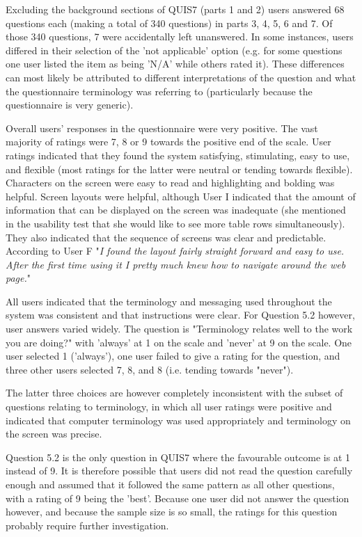 Excluding the background sections of QUIS7 (parts 1 and 2) users answered 68 questions each (making a total of 340 questions) in parts 3, 4, 5, 6 and 7. Of those 340 questions, 7 were accidentally left unanswered. In some instances, users differed in their selection of the 'not applicable' option (e.g. for some questions one user listed the item as being 'N/A' while others rated it). These differences can most likely be attributed to different interpretations of the question and what the questionnaire terminology was referring to (particularly because the questionnaire is very generic).

Overall users' responses in the questionnaire were very positive. The vast majority of ratings were 7, 8 or 9 towards the positive end of the scale.  User ratings indicated that they found the system satisfying, stimulating, easy to use, and flexible (most ratings for the latter were neutral or tending towards flexible). Characters on the screen were easy to read and highlighting and bolding was helpful. Screen layouts were helpful, although User I indicated that the amount of information that can be displayed on the screen was inadequate (she mentioned in the usability test that she would like to see more table rows simultaneously). They also indicated that the sequence of screens was clear and predictable. According to User F "\textit{I found the layout fairly straight forward and easy to use. After the first time using it I pretty much knew how to navigate around the web page.}"

All users indicated that the terminology and messaging used throughout the system was consistent and that instructions were clear. For Question 5.2 however, user answers varied widely. The question is "Terminology relates well to the work you are doing?"  with 'always' at 1 on the scale and 'never' at 9 on the scale. One user selected 1 ('always'), one user failed to give a rating for the question, and three other users selected 7, 8, and 8 (i.e. tending towards "never"). 

The latter three choices are however completely inconsistent with the subset of questions relating to terminology, in which all user ratings were positive and indicated that computer terminology was used appropriately and terminology on the screen was precise. 

Question 5.2 is the only question in QUIS7 where the favourable outcome is at 1 instead of 9. It is therefore possible that users did not read the question carefully enough and assumed that it followed the same pattern as all other questions, with a rating of 9 being the 'best'. Because one user did not answer the question however, and because the sample size is so small, the ratings for this question probably require further investigation. 

